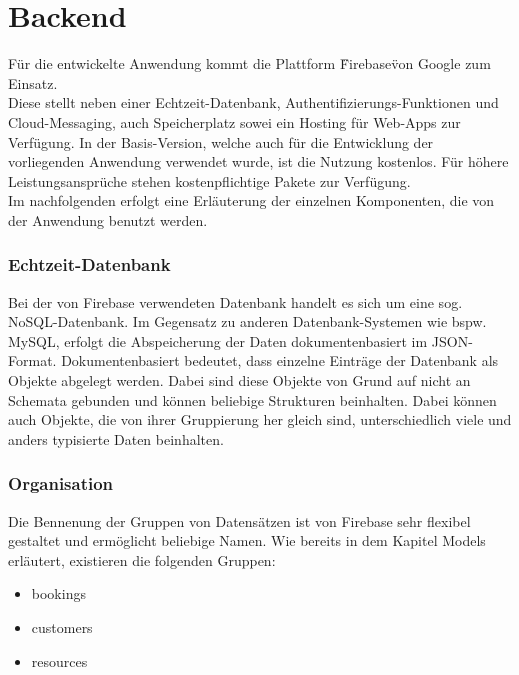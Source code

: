 \chapter{Backend}
Für die entwickelte Anwendung kommt die Plattform \"Firebase\" von Google zum Einsatz.
\\
Diese stellt neben einer Echtzeit-Datenbank, Authentifizierungs-Funktionen und Cloud-Messaging, auch Speicherplatz sowei ein Hosting für Web-Apps zur Verfügung.
In der Basis-Version, welche auch für die Entwicklung der vorliegenden Anwendung verwendet wurde, ist die Nutzung kostenlos. Für höhere Leistungsansprüche stehen kostenpflichtige Pakete zur Verfügung.\\
Im nachfolgenden erfolgt eine Erläuterung der einzelnen Komponenten, die von der Anwendung benutzt werden.

\subsection{Echtzeit-Datenbank}
Bei der von Firebase verwendeten Datenbank handelt es sich um eine sog. NoSQL-Datenbank. Im Gegensatz zu anderen Datenbank-Systemen wie bspw. MySQL, erfolgt die Abspeicherung der Daten dokumentenbasiert im JSON-Format.
Dokumentenbasiert bedeutet, dass einzelne Einträge der Datenbank als Objekte abgelegt werden. Dabei sind diese Objekte von Grund auf nicht an Schemata gebunden und können beliebige Strukturen beinhalten.
Dabei können auch Objekte, die von ihrer Gruppierung her gleich sind, unterschiedlich viele und anders typisierte Daten beinhalten.\\


\subsection{Organisation}
Die Bennenung der Gruppen von Datensätzen ist von Firebase sehr flexibel gestaltet und ermöglicht beliebige Namen.
Wie bereits in dem Kapitel Models erläutert, existieren die folgenden Gruppen:
\begin{itemize}
\item bookings
\item customers
\item resources
\end{itemize}


